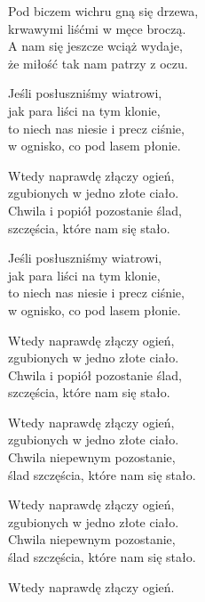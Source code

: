 \begin{text}
    Pod biczem wichru gną się drzewa,\\
    krwawymi liśćmi w męce broczą.\\
    A nam się jeszcze wciąż wydaje,\\
    że miłość tak nam patrzy z oczu.

    Jeśli posłuszniśmy wiatrowi,\\
    jak para liści na tym klonie,\\
    to niech nas niesie i precz ciśnie,\\
    w ognisko, co pod lasem płonie.

    Wtedy naprawdę złączy ogień,\\
    zgubionych w jedno złote ciało.\\
    Chwila i popiół pozostanie ślad,\\
    szczęścia, które nam się stało.

    Jeśli posłuszniśmy wiatrowi,\\
    jak para liści na tym klonie,\\
    to niech nas niesie i precz ciśnie,\\
    w ognisko, co pod lasem płonie.

    Wtedy naprawdę złączy ogień,\\
    zgubionych w jedno złote ciało.\\
    Chwila i popiół pozostanie ślad,\\
    szczęścia, które nam się stało.

    Wtedy naprawdę złączy ogień,\\
    zgubionych w jedno złote ciało.\\
    Chwila niepewnym pozostanie,\\
    ślad szczęścia, które nam się stało.

    Wtedy naprawdę złączy ogień,\\
    zgubionych w jedno złote ciało.\\
    Chwila niepewnym pozostanie,\\
    ślad szczęścia, które nam się stało.

    Wtedy naprawdę złączy ogień.
\end{text}
\begin{chord}

\end{chord}